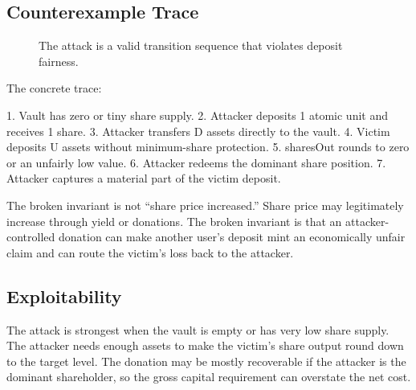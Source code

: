 \subsection{Counterexample Trace}

\begin{figure}[htbp]
\centering
{}
\caption{The attack is a valid transition sequence that violates deposit fairness.}
\end{figure}

The concrete trace:

\begin{codeblock}
1. Vault has zero or tiny share supply.
2. Attacker deposits 1 atomic unit and receives 1 share.
3. Attacker transfers D assets directly to the vault.
4. Victim deposits U assets without minimum-share protection.
5. sharesOut rounds to zero or an unfairly low value.
6. Attacker redeems the dominant share position.
7. Attacker captures a material part of the victim deposit.
\end{codeblock}

The broken invariant is not ``share price increased.'' Share price may legitimately increase through yield or donations. The broken invariant is that an attacker-controlled donation can make another user's deposit mint an economically unfair claim and can route the victim's loss back to the attacker.

\subsection{Exploitability}

The attack is strongest when the vault is empty or has very low share supply. The attacker needs enough assets to make the victim's share output round down to the target level. The donation may be mostly recoverable if the attacker is the dominant shareholder, so the gross capital requirement can overstate the net cost.

